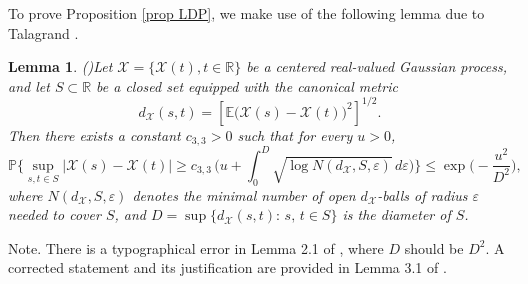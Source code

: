 \documentclass[11pt, reqno]{amsart}
\numberwithin{equation}{section}
\newtheorem{lemma}{Lemma}[section]
\newcommand{\1}{{\bf 1}}
\newcommand{\2}{{\bf 2}}
\begin{document}
   To prove Proposition \ref{prop LDP}, we make use of   the following lemma due to Talagrand \cite{Tal95}.
     \begin{lemma}(\cite[Lemma 2.1]{Tal95})\label{Lem:Tail}
Let $\mathcal X = \{\mathcal X(t), t \in \mathbb R\}$ be a centered real-valued Gaussian process, 
and let $S \subset \mathbb R$ be a closed set equipped with the canonical metric  
$$d_{\mathcal X}(s, t) = \left[\mathbb E\big(\mathcal X(s) -\mathcal  X(t)\big)^2\right]^{1/2}.$$
Then there exists a  constant  $c_{3,3}>0$ such that for every $u >0$, 
\begin{equation*}%
\mathbb P\Biggl\{ \sup_{s, t \in S} |\mathcal X(s) - \mathcal X(t)| \ge c_{3,3}\,
\bigg(u + \int_0^D \sqrt{\log N(d_{\mathcal X}, S, \varepsilon)}\, d\varepsilon \bigg)\Bigg\}
\le \exp\bigg( - \frac{u^2} {D^2}\bigg),
\end{equation*}
where $N(d_{\mathcal X}, S, \varepsilon)$ denotes the minimal number of open $d_{\mathcal X}$-balls
of radius $\varepsilon$ needed to cover $S$, and   $D= \sup\{ d_{\mathcal X}(s,t):\,
s,\, t \in S\}$ is the diameter of $S$.
\end{lemma}
 {Note. There is a  typographical error in    Lemma 2.1 of \cite{Tal95}, where     $D$  should be  $D^2$.     
A corrected statement and its justification are provided in Lemma 3.1 of \cite{DMX17}.}
\end{document}
